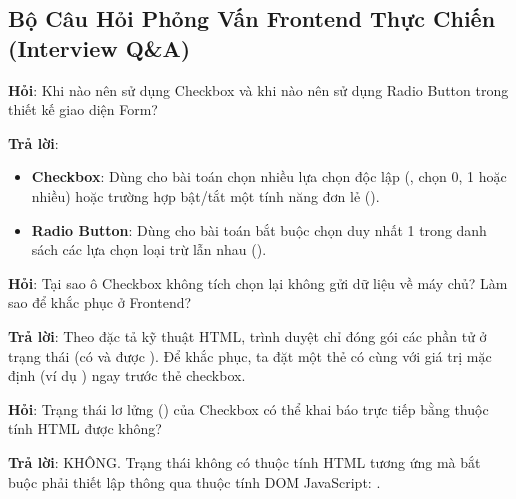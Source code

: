 \subsection{Bộ Câu Hỏi Phỏng Vấn Frontend Thực Chiến (Interview Q\&A)}

\begin{noteBox}
\textbf{Hỏi}: Khi nào nên sử dụng Checkbox và khi nào nên sử dụng Radio Button trong thiết kế giao diện Form?
\par\vspace{3pt}
\textbf{Trả lời}:
\begin{itemize}[leftmargin=1.5em, itemsep=2pt, parsep=0pt]
    \item \textbf{Checkbox}: Dùng cho bài toán chọn nhiều lựa chọn độc lập (, chọn 0, 1 hoặc nhiều) hoặc trường hợp bật/tắt một tính năng đơn lẻ ().
    \item \textbf{Radio Button}: Dùng cho bài toán bắt buộc chọn duy nhất 1 trong danh sách các lựa chọn loại trừ lẫn nhau ().
\end{itemize}
\end{noteBox}

\begin{noteBox}
\textbf{Hỏi}: Tại sao ô Checkbox không tích chọn lại không gửi dữ liệu về máy chủ? Làm sao để khắc phục ở Frontend?
\par\vspace{3pt}
\textbf{Trả lời}: Theo đặc tả kỹ thuật HTML, trình duyệt chỉ đóng gói các phần tử ở trạng thái  (có  và được ). Để khắc phục, ta đặt một thẻ  có cùng  với giá trị mặc định (ví dụ ) ngay trước thẻ checkbox.
\end{noteBox}

\begin{noteBox}
\textbf{Hỏi}: Trạng thái lơ lửng () của Checkbox có thể khai báo trực tiếp bằng thuộc tính HTML được không?
\par\vspace{3pt}
\textbf{Trả lời}: KHÔNG. Trạng thái  không có thuộc tính HTML tương ứng mà bắt buộc phải thiết lập thông qua thuộc tính DOM JavaScript: .
\end{noteBox}

